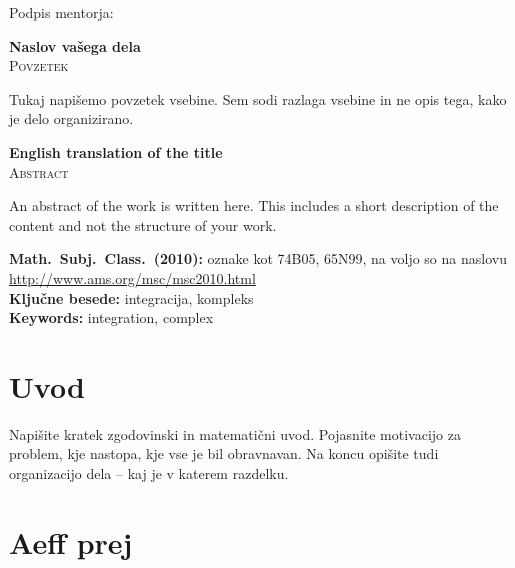 \documentclass[12pt,a4paper,twoside]{article}
\newcommand{\naslovdela}{Naslov vašega dela}
\newcommand{\kljucnebesede}{integracija\sep kompleks} %
\newcommand{\keywords}{integration\sep complex} %
\newcommand{\sep}{, }  %
\theoremstyle{definition} %
\theoremstyle{plain} %
\numberwithin{equation}{section}  %
\begin{document}
\vspace{2cm}
\hspace*{\fill} Podpis mentorja: \phantom{prostor za podpis}


\cleardoublepage
{}

\begin{center}
\textbf{\naslovdela} \\[3mm]
\textsc{Povzetek} \\[2mm]
\end{center}
Tukaj napišemo povzetek vsebine. Sem sodi razlaga vsebine in ne opis tega, kako je delo
organizirano.



\vfill
\begin{center}
\textbf{English translation of the title} \\[3mm] %
\textsc{Abstract}\\[2mm]
\end{center}

An abstract of the work is written here. This includes a short description of
the content and not the structure of your work.

\vfill\noindent
\textbf{Math.~Subj.~Class.~(2010):} oznake kot 74B05, 65N99, na voljo so na naslovu
\url{http://www.ams.org/msc/msc2010.html} \\[1mm]
\textbf{Ključne besede:} \kljucnebesede \\[1mm]
\textbf{Keywords:} \keywords

\cleardoublepage

\setcounter{page}{1}    %

\section{Uvod}
Napišite kratek zgodovinski in matematični uvod.  Pojasnite motivacijo za problem, kje
nastopa, kje vse je bil obravnavan. Na koncu opišite tudi organizacijo dela -- kaj je v
katerem razdelku.


\section{Aeff prej}
\end{document}
